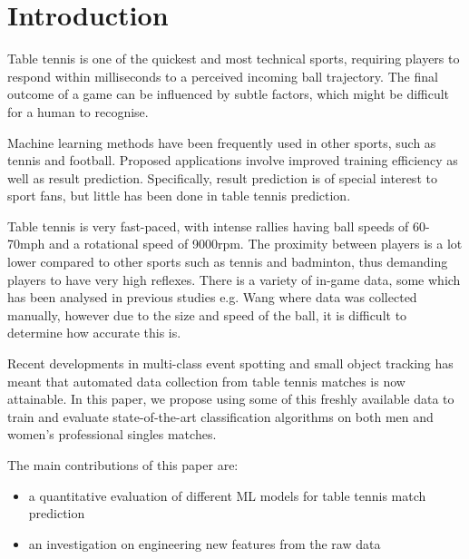 \section{Introduction}
Table tennis is one of the quickest and most technical sports, requiring players to respond within milliseconds to a perceived incoming ball trajectory. The final outcome of a game can be influenced by subtle factors, which might be difficult for a human to recognise. 

Machine learning methods have been frequently used in other sports, such as tennis and football. Proposed applications involve improved training efficiency 
as well as result prediction. Specifically, result prediction is of special interest to sport fans, but little has been done in table tennis prediction.

Table tennis is very fast-paced, with intense rallies having ball speeds of 60-70mph and a rotational speed of 9000rpm. The proximity between players is a lot lower compared to other sports such as tennis and badminton, thus demanding players to have very high reflexes.
There is a variety of in-game data, some which has been analysed in previous studies e.g. Wang \etal \cite{wang2019tac} where data was collected manually, however due to the size and speed of the ball, it is difficult to determine how accurate this is.

Recent developments in  multi-class event spotting and small object tracking has meant that automated data collection from table tennis matches is now attainable. 
In this paper, we propose using some of this freshly available data to train and evaluate  state-of-the-art classification algorithms on both men and women's professional singles matches. %

The main contributions of this paper are:
\begin{itemize}
    \item a quantitative evaluation of different ML models for table tennis match prediction
    \item  an investigation on engineering new features from the raw data
\end{itemize}

